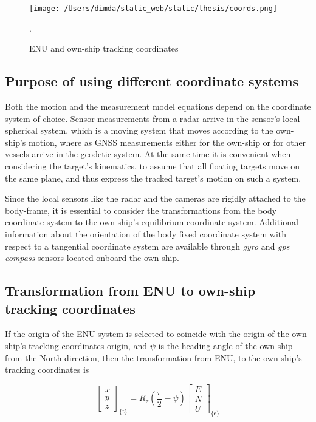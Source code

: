 \begin{figure}[H] 	
	\centering
	\texttt{[image: /Users/dimda/static\_web/static/thesis/coords.png]}
	\caption{ENU and own-ship tracking coordinates}.
	\label{fig:tracking_coords}	
\end{figure}

\subsection{Purpose of using different coordinate systems}

Both the motion and the measurement model equations depend on the coordinate system of choice. Sensor measurements from a radar arrive in the sensor's local spherical system, which is a moving system that moves according to the own-ship's motion, where as GNSS measurements either for the own-ship or for other vessels arrive in the geodetic system. At the same time it is convenient when considering the target's kinematics, to assume that all floating targets move on the same plane, and thus express the tracked target's motion on such a system.

Since the local sensors like the radar and the cameras are rigidly attached to the body-frame, it is essential to consider the transformations from the body coordinate system to the own-ship's equilibrium coordinate system. Additional information about the orientation of the body fixed coordinate system with respect to a tangential coordinate system are available through \emph{gyro} and \emph{gps compass} sensors located onboard the own-ship. 

\subsection{Transformation from ENU to own-ship tracking coordinates}


If the origin of the ENU system is selected to coincide with the origin of the own-ship's tracking coordinates origin, and $\psi$ is the heading angle of the own-ship from the North direction, then the transformation from ENU, to the own-ship's tracking coordinates is





\begin{equation}
\begin{bmatrix}
x \\
y \\
z
\end{bmatrix}_{\text{\{t\}}} = R_{z}(\frac{\pi}{2}-\psi)
\begin{bmatrix}
E \\
N \\
U
\end{bmatrix}_{\text{\{e\}}}
\end{equation}

